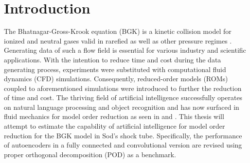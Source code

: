 
\chapter{Introduction}
\label{CH:intro}


The Bhatnagar-Gross-Krook equation (BGK) is a kinetic collision model for ionized and neutral gases valid in rarefied as well as other pressure regimes \cite{BGK}. Generating data of such a flow field is essential for various industry and scientific applications\cite{rarefiedGDapplc}. With the intention to reduce time and cost during the data generating process, experiments were substituted with computational fluid dynamics (CFD) simulations. Consequently, reduced-order models (ROMs) coupled to aforementioned simulations were introduced to further the reduction of time and cost. The thriving field of artificial intelligence successfully operates on natural language processing and object recognition and has now surfaced in fluid mechanics for model order reduction as seen in \cite{Carlberg} and \cite{bukka2020assessment}. This thesis will attempt to estimate the capability of artificial intelligence for model order reduction for the BGK model in Sod's shock tube. Specifically, the performance of autoencoders in a fully connected and convolutional version are revised using proper orthogonal decomposition (POD) as a benchmark.\\


